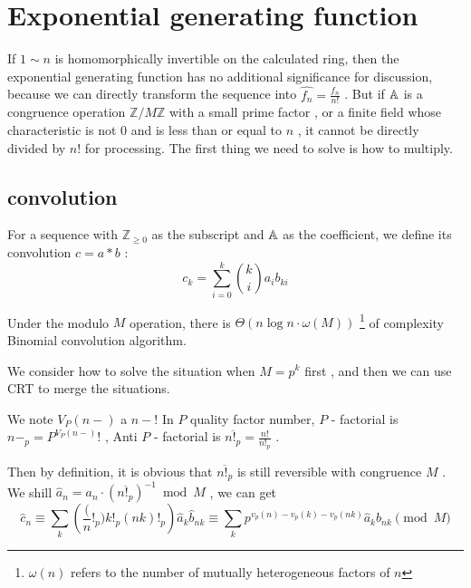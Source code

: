 \section { Exponential generating function }

If $ 1 \sim n $ is homomorphically invertible on the calculated ring, then the exponential generating function has no additional significance for discussion, because we can directly transform the sequence into $ \widehat {f_n} = \frac {f_n}{ n!} $ . But if $  \mathbb A $ is a congruence operation $ \mathbb Z/M \mathbb Z $ with a small prime factor , or a finite field whose characteristic is not $ 0 $ and is less than or equal to $ n $ , it cannot be directly divided by $ n! $ for processing. The first thing we need to solve is how to multiply.

\subsection { convolution }

\begin { definition }
For a sequence with $ \mathbb Z_{ \ge 0} $ as the subscript and $  \mathbb A $ as the coefficient, we define its convolution $ c = a * b $ :
$$
c_k = \sum _{i = 0}^k \binom ki a_i b_{ki}
$$
\end { definition }

\begin { theorem }
Under the modulo $ M $ operation, there is $ \Theta (n \log n \cdot  \omega (M)) $ \footnote { $ \omega (n) $ refers to the number of mutually heterogeneous factors of $ n $ } of complexity Binomial convolution algorithm.
\end { theorem }

We consider how to solve the situation when $ M = p^k $ first , and then we can use CRT to merge the situations.

We note $ V_P (n-) $ a $ n-! $ In $ P $ quality factor number, $ P $ - factorial is $ n-_p = P ^ {V_P (n-)}! $ , Anti $ P $ - factorial is $ \overline {n!_p} = \frac {n!}{n!_p} $ .

Then by definition, it is obvious that $ \overline {n!_p} $ is still reversible with congruence $ M $ . We shill $ \widehat a_n = a_n \cdot  \left ( \overline {n!_p} \right )^{-1} \bmod M $ , we can get
$$
\widehat c_n \equiv  \sum _k \left ( \frac (n!_p){k!_p (nk)!_p} \right ) \widehat a_k \widehat b_{nk} \equiv  \sum _k p^{v_p( n)-v_p(k)-v_p(nk)} \widehat a_k \widehat b_{nk} \pmod M
$$

